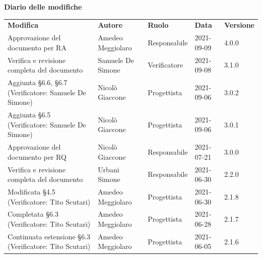 \documentclass[a4paper]{article}
\begin{document}
\begin{center}
    \textbf{\Large Diario delle modifiche}\\
    \vspace{10px}
    \begin{table}[h!]
        \centering
        \renewcommand{\arraystretch}{1.8}
        \begin{tabular}{p{160px} p{90px} p{70px} p{55px} p{45px}}
            \rowcolor{logo!70} \textbf{Modifica}                                      & \textbf{Autore}   & \textbf{Ruolo} & \textbf{Data} & \textbf{Versione} \\
            Approvazione del documento per RA                                         & Amedeo Meggiolaro & Responsabile   & 2021-09-09    & 4.0.0             \\
            Verifica e revisione completa del documento                               & Samuele De Simone & Verificatore   & 2021-09-08    & 3.1.0             \\
            Aggiunta \S 6.6, \S 6.7 \newline(Verificatore: Samuele De Simone)         & Nicolò Giaccone   & Progettista    & 2021-09-06    & 3.0.2             \\
            Aggiunta \S 6.5 \newline(Verificatore: Samuele De Simone)                 & Nicolò Giaccone   & Progettista    & 2021-09-06    & 3.0.1             \\
            Approvazione del documento per RQ                                         & Nicolò Giaccone   & Responsabile   & 2021-07-21    & 3.0.0             \\
            Verifica e revisione completa del documento                               & Urbani Simone     & Responsabile   & 2021-06-30    & 2.2.0             \\
            Modificata \S 4.5 \newline(Verificatore: Tito Scutari)                    & Amedeo Meggiolaro & Progettista    & 2021-06-30    & 2.1.8             \\
            Completata \S 6.3 \newline(Verificatore: Tito Scutari)                    & Amedeo Meggiolaro & Progettista    & 2021-06-28    & 2.1.7             \\
            Continuata estensione \S 6.3 \newline(Verificatore: Tito Scutari)         & Amedeo Meggiolaro & Progettista    & 2021-06-05    & 2.1.6             \\

\end{tabular}
\end{table}
\end{center}
\end{document}
